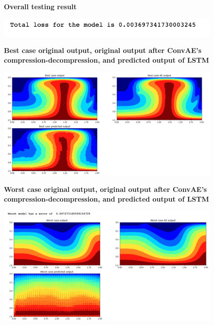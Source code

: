 \begin{figure}[H]
    \textbf{Overall testing result}\par\medskip
    \includegraphics[scale=0.7]{Report LaTeX/figures/mantle_convection_images/LSTM_OverallTesting.png}
\end{figure}

\begin{figure}[H]
    \textbf{Best case original output, original output after ConvAE's compression-decompression, and predicted output of LSTM}\par\medskip
    \includegraphics[scale=0.5]{Report LaTeX/figures/mantle_convection_images/LSTM_Best.png}
\end{figure}

\begin{figure}[H]
    \textbf{Worst case original output, original output after ConvAE's compression-decompression, and predicted output of LSTM}\par\medskip
    \includegraphics[scale=0.5]{Report LaTeX/figures/mantle_convection_images/LSTM_Worst.png}
\end{figure}

